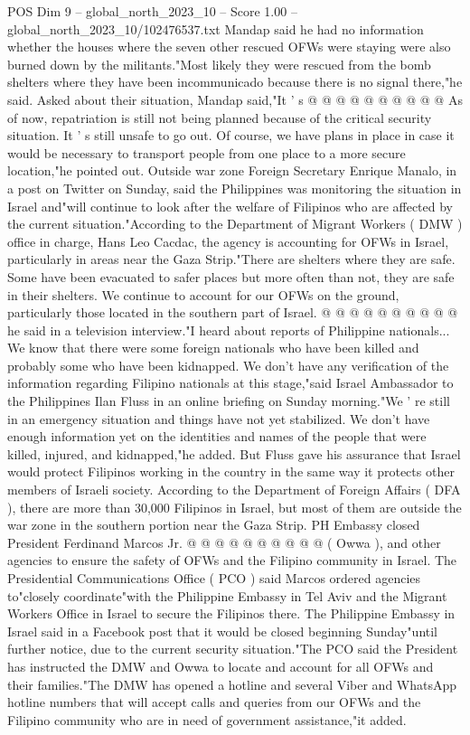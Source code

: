 \begin{textsample}{POS Dim 9 – global\_north\_2023\_10 – Score 1.00 – global\_north\_2023\_10/102476537.txt}
Mandap said he had no information whether the houses where the seven other rescued OFWs were staying were also burned down by the militants."Most likely they were rescued from the bomb shelters where they have been incommunicado because there is no signal there,"he said.
Asked about their situation, Mandap said,"It ' s @ @ @ @ @ @ @ @ @ @ As of now, repatriation is still not being planned because of the critical security situation.
It ' s still unsafe to go out.
Of course, we have plans in place in case it would be necessary to transport people from one place to a more secure location,"he pointed out.
Outside war zone Foreign Secretary Enrique Manalo, in a post on Twitter on Sunday, said the Philippines was monitoring the situation in Israel and"will continue to look after the welfare of Filipinos who are affected by the current situation."According to the Department of Migrant Workers ( DMW ) office in charge, Hans Leo Cacdac, the agency is accounting for OFWs in Israel, particularly in areas near the Gaza Strip."There are shelters where they are safe.
Some have been evacuated to safer places but more often than not, they are safe in their shelters.
We continue to account for our OFWs on the ground, particularly those located in the southern part of Israel. @ @ @ @ @ @ @ @ @ @ he said in a television interview."I heard about reports of Philippine nationals...
We know that there were some foreign nationals who have been killed and probably some who have been kidnapped.
We don't have any verification of the information regarding Filipino nationals at this stage,"said Israel Ambassador to the Philippines Ilan Fluss in an online briefing on Sunday morning."We ' re still in an emergency situation and things have not yet stabilized.
We don't have enough information yet on the identities and names of the people that were killed, injured, and kidnapped,"he added.
But Fluss gave his assurance that Israel would protect Filipinos working in the country in the same way it protects other members of Israeli society.
According to the Department of Foreign Affairs ( DFA ), there are more than 30,000 Filipinos in Israel, but most of them are outside the war zone in the southern portion near the Gaza Strip.
PH Embassy closed President Ferdinand Marcos Jr. @ @ @ @ @ @ @ @ @ @ ( Owwa ), and other agencies to ensure the safety of OFWs and the Filipino community in Israel.
The Presidential Communications Office ( PCO ) said Marcos ordered agencies to"closely coordinate"with the Philippine Embassy in Tel Aviv and the Migrant Workers Office in Israel to secure the Filipinos there.
The Philippine Embassy in Israel said in a Facebook post that it would be closed beginning Sunday"until further notice, due to the current security situation."The PCO said the President has instructed the DMW and Owwa to locate and account for all OFWs and their families."The DMW has opened a hotline and several Viber and WhatsApp hotline numbers that will accept calls and queries from our OFWs and the Filipino community who are in need of government assistance,"it added.

\end{textsample}
